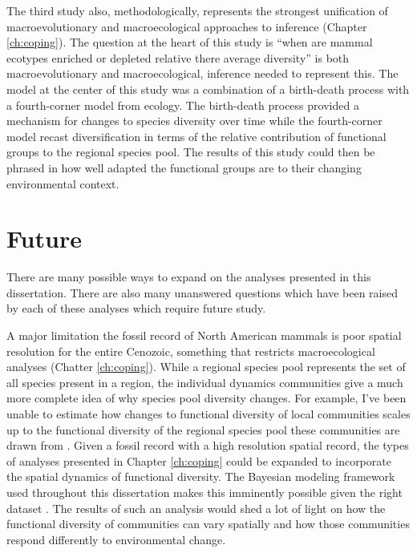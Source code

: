 The third study also, methodologically, represents the strongest unification of macroevolutionary and macroecological approaches to inference (Chapter \ref{ch:coping}). The question at the heart of this study is ``when are mammal ecotypes enriched or depleted relative there average diversity'' is both macroevolutionary and macroecological, inference needed to represent this. The model at the center of this study was a combination of a birth-death process with a fourth-corner model from ecology. The birth-death process provided a mechanism for changes to species diversity over time while the fourth-corner model recast diversification in terms of the relative contribution of functional groups to the regional species pool. The results of this study could then be phrased in how well adapted the functional groups are to their changing environmental context.



\section{Future}

There are many possible ways to expand on the analyses presented in this dissertation. There are also many unanswered questions which have been raised by each of these analyses which require future study.

A major limitation the fossil record of North American mammals is poor spatial resolution for the entire Cenozoic, something that restricts macroecological analyses (Chatter \ref{ch:coping}). While a regional species pool represents the set of all species present in a region, the individual dynamics communities give a much more complete idea of why species pool diversity changes. For example, I've been unable to estimate how changes to functional diversity of local communities scales up to the functional diversity of the regional species pool these communities are drawn from \citep{Harrison2008}. Given a fossil record with a high resolution spatial record, the types of analyses presented in Chapter \ref{ch:coping} could be expanded to incorporate the spatial dynamics of functional diversity. The Bayesian modeling framework used throughout this dissertation makes this imminently possible given the right dataset \citep{Banerjee2004}. The results of such an analysis would shed a lot of light on how the functional diversity of communities can vary spatially and how those communities respond differently to environmental change.

